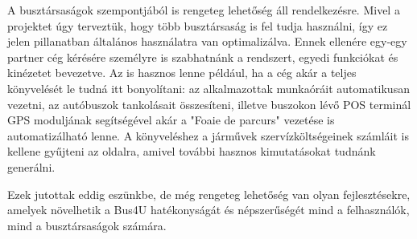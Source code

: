 A busztársaságok szempontjából is rengeteg lehetőség áll rendelkezésre. Mivel a projektet úgy terveztük, hogy több busztársaság is fel tudja használni, így ez jelen pillanatban általános használatra van optimalizálva. Ennek ellenére egy-egy partner cég kérésére személyre is szabhatnánk a rendszert, egyedi funkciókat és kinézetet bevezetve. Az is hasznos lenne például, ha a cég akár a teljes könyvelését le tudná itt bonyolítani: az alkalmazottak munkaóráit automatikusan vezetni, az autóbuszok tankolásait összesíteni, illetve buszokon lévő POS terminál GPS moduljának segítségével akár a "Foaie de parcurs" vezetése is automatizálható lenne. A könyveléshez a járművek szervízköltségeinek számláit is kellene gyűjteni az oldalra, amivel további hasznos kimutatásokat tudnánk generálni.

Ezek jutottak eddig eszünkbe, de még rengeteg lehetőség van olyan fejlesztésekre, amelyek növelhetik a Bus4U hatékonyságát és népszerűségét mind a felhasználók, mind a busztársaságok számára.